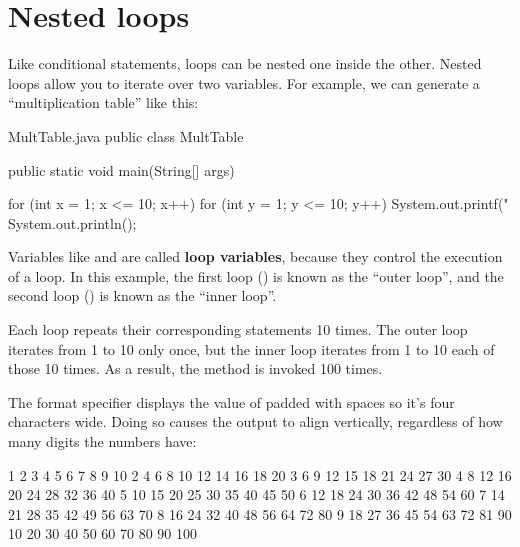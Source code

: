 \section{Nested loops}
\label{nested}


Like conditional statements, loops can be nested one inside the other.
Nested loops allow you to iterate over two variables.
For example, we can generate a ``multiplication table'' like this:

\begin{trinket} [230] {MultTable.java}
public class MultTable {
    public static void main(String[] args) {
       
       for (int x = 1; x <= 10; x++) {
          for (int y = 1; y <= 10; y++) {
             System.out.printf("%
          }
          System.out.println();
       }
    }
}
\end{trinket}


Variables like  and  are called {\bf loop variables}, because they control the execution of a loop.
In this example, the first loop () is known as the ``outer loop'', and the second loop () is known as the ``inner loop''.

Each loop repeats their corresponding statements 10 times.
The outer loop iterates from 1 to 10 only once, but the inner loop iterates from 1 to 10 each of those 10 times.
As a result, the  method is invoked 100 times.


The format specifier  displays the value of  padded with spaces so it's four characters wide.
Doing so causes the output to align vertically, regardless of how many digits the numbers have:

\begin{stdout}
   1   2   3   4   5   6   7   8   9  10
   2   4   6   8  10  12  14  16  18  20
   3   6   9  12  15  18  21  24  27  30
   4   8  12  16  20  24  28  32  36  40
   5  10  15  20  25  30  35  40  45  50
   6  12  18  24  30  36  42  48  54  60
   7  14  21  28  35  42  49  56  63  70
   8  16  24  32  40  48  56  64  72  80
   9  18  27  36  45  54  63  72  81  90
  10  20  30  40  50  60  70  80  90 100
\end{stdout}

